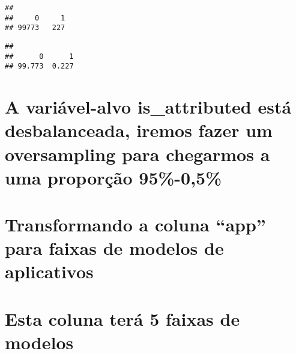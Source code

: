 \documentclass[
]{article}
\newenvironment{Shaded}{\begin{snugshade}}{\end{snugshade}}
\newcommand{\DecValTok}[1]{\textcolor[rgb]{0.00,0.00,0.81}{#1}}
\newcommand{\FunctionTok}[1]{\textcolor[rgb]{0.00,0.00,0.00}{#1}}
\newcommand{\NormalTok}[1]{#1}
\newcommand{\OtherTok}[1]{\textcolor[rgb]{0.56,0.35,0.01}{#1}}
\newcommand{\SpecialCharTok}[1]{\textcolor[rgb]{0.00,0.00,0.00}{#1}}
\begin{document}
\begin{verbatim}
## 
##     0     1 
## 99773   227
\end{verbatim}

\begin{Shaded}
\end{Shaded}

\begin{verbatim}
## 
##      0      1 
## 99.773  0.227
\end{verbatim}

\hypertarget{a-variuxe1vel-alvo-is_attributed-estuxe1-desbalanceada-iremos-fazer-um-oversampling-para-chegarmos-a-uma-proporuxe7uxe3o-95-05}{%
\section{A variável-alvo is\_attributed está desbalanceada, iremos fazer
um oversampling para chegarmos a uma proporção
95\%-0,5\%}\label{a-variuxe1vel-alvo-is_attributed-estuxe1-desbalanceada-iremos-fazer-um-oversampling-para-chegarmos-a-uma-proporuxe7uxe3o-95-05}}

\hypertarget{transformando-a-coluna-app-para-faixas-de-modelos-de-aplicativos}{%
\section{Transformando a coluna ``app'' para faixas de modelos de
aplicativos}\label{transformando-a-coluna-app-para-faixas-de-modelos-de-aplicativos}}

\hypertarget{esta-coluna-teruxe1-5-faixas-de-modelos}{%
\section{Esta coluna terá 5 faixas de
modelos}\label{esta-coluna-teruxe1-5-faixas-de-modelos}}
\end{document}
